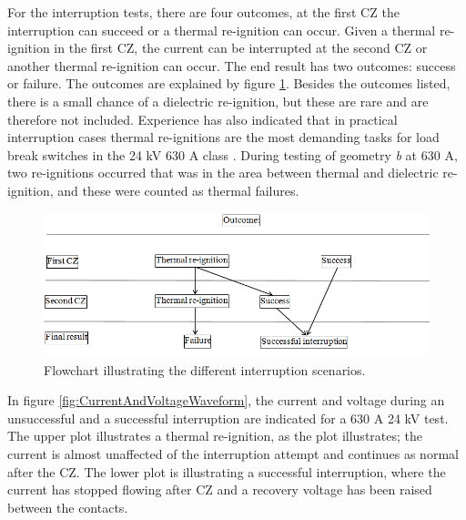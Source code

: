 \documentclass[10pt,a4paper,twoside]{article}
\begin{document}
For the interruption tests, there are four outcomes, at the first CZ the interruption can succeed or a thermal re-ignition can occur. Given a thermal re-ignition in the first CZ, the current can be interrupted at the second CZ or another thermal re-ignition can occur. The end result has two outcomes: success or failure. The outcomes are explained by figure \ref{fig:pilSuccessOfFail}. Besides the outcomes listed, there is a small chance of a dielectric re-ignition, but these are rare and are therefore not included. Experience has also indicated that in practical interruption cases thermal re-ignitions are the most demanding tasks for load break switches in the 24 kV 630 A class \cite{bib:AFIMVLBA}. During testing of geometry \textit{b} at 630 A, two re-ignitions occurred that was in the area between thermal and dielectric re-ignition, and these were counted as thermal failures.

\begin{figure}[H]
\centering
\includegraphics[scale=0.6]{Bilder/Results/interruptionFlowChart.png}
\caption{Flowchart illustrating the different interruption scenarios.} \label{fig:pilSuccessOfFail}
\end{figure}

In figure \ref{fig:CurrentAndVoltageWaveform}, the current and voltage during an unsuccessful and a successful interruption are indicated for a 630 A 24 kV test. The upper plot illustrates a thermal re-ignition, as the plot illustrates; the current is almost unaffected of the interruption attempt and continues as normal after the CZ. The lower plot is illustrating a successful interruption, where the current has stopped flowing after CZ and a recovery voltage has been raised between the contacts.
\end{document}
